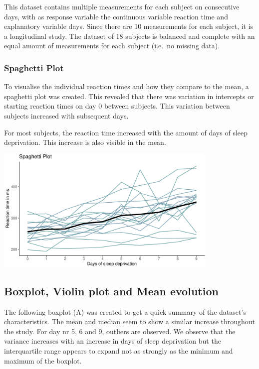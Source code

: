 \documentclass[
]{article}
\begin{document}
This dataset contains multiple measurements for each subject on
consecutive days, with as response variable the continuous variable
reaction time and explanatory variable days. Since there are 10
measurements for each subject, it is a longitudinal study. The dataset
of 18 subjects is balanced and complete with an equal amount of
measurements for each subject (i.e.~no missing data).

\hypertarget{spaghetti-plot}{%
\subsubsection{Spaghetti Plot}\label{spaghetti-plot}}

To visualise the individual reaction times and how they compare to the
mean, a spaghetti plot was created. This revealed that there was
variation in intercepts or starting reaction times on day 0 between
subjects. This variation between subjects increased with subsequent
days.

For most subjects, the reaction time increased with the amount of days
of sleep deprivation. This increase is also visible in the mean.

\begin{center}\includegraphics[width=0.8\textwidth]{common_sleep_files/figure-latex/spaghetti-1} \end{center}

\hypertarget{boxplot-violin-plot-and-mean-evolution}{%
\subsection{Boxplot, Violin plot and Mean
evolution}\label{boxplot-violin-plot-and-mean-evolution}}

The following boxplot (A) was created to get a quick summary of the
dataset's characteristics. The mean and median seem to show a similar
increase throughout the study. For day nr 5, 6 and 9, outliers are
observed. We observe that the variance increases with an increase in
days of sleep deprivation but the interquartile range appears to expand
not as strongly as the minimum and maximum of the boxplot.
\end{document}
